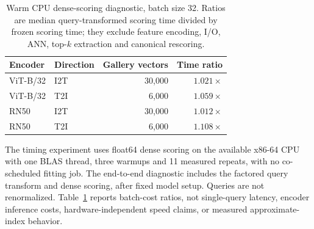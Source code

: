 \documentclass[11pt]{article}
\begin{document}
\begin{table}[t]\centering\small
\caption{Warm CPU dense-scoring diagnostic, batch size 32. Ratios are
median query-transformed scoring time divided by frozen scoring time;
they exclude feature encoding, I/O, ANN, top-$k$ extraction and canonical
rescoring.}\label{tab:querytiming}
\begin{tabular}{llrr}
\toprule
Encoder & Direction & Gallery vectors & Time ratio\\
\midrule
ViT-B/32 & I2T & 30,000 & $1.021\times$\\
ViT-B/32 & T2I & 6,000 & $1.059\times$\\
RN50 & I2T & 30,000 & $1.012\times$\\
RN50 & T2I & 6,000 & $1.108\times$\\
\bottomrule
\end{tabular}
\end{table}
The timing experiment uses float64 dense scoring on the available x86-64
CPU with one BLAS thread, three warmups and 11 measured repeats, with no
co-scheduled fitting job. The end-to-end diagnostic includes the factored
query transform and dense scoring, after fixed model setup. Queries are
not renormalized. Table~\ref{tab:querytiming} reports batch-cost ratios,
not single-query latency, encoder inference costs, hardware-independent
speed claims, or measured approximate-index behavior.
\end{document}
